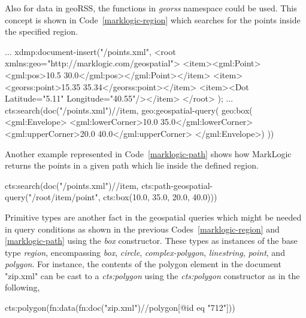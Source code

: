 \documentclass[a4paper,12pt]{article}
\begin{document}
Also for data in geoRSS, the functions in \textit{georss} namespace could be used. 
This concept is shown in Code~\ref{marklogic-region} which searches for the points inside the specified region. 
\vspace{10px}
\begin{fakeXML}[escapechar=\%,label=marklogic-region,caption=A query example in MarkLogic]
...
xdmp:document-insert("/points.xml",
<root xmlns:geo="http://marklogic.com/geospatial">
  <item><gml:Point><gml:pos>10.5 30.0</gml:pos></gml:Point></item>
  <item><georss:point>15.35 35.34</georss:point></item>
  <item><Dot Latitude="5.11" Longitude="40.55"/></item>
</root> );
 ...
cts:search(doc("/points.xml")//item, 
 geo:geospatial-query(
   geo:box(
     <gml:Envelope>
       <gml:lowerCorner>10.0 35.0</gml:lowerCorner>
       <gml:upperCorner>20.0 40.0</gml:upperCorner>
     </gml:Envelope>)
 ))
 
 \end{fakeXML}
\vspace{10px}
Another example represented in Code~\ref{marklogic-path} shows how MarkLogic returns the 
points in a given path which lie inside the defined region.
\vspace{10px}
\begin{fakeXML}[escapechar=\%,label=marklogic-path,caption=Another query example in MarkLogic]
cts:search(doc("/points.xml")//item,
  cts:path-geospatial-query("/root/item/point", 
  			cts:box(10.0, 35.0, 20.0, 40.0)))
\end{fakeXML}
\vspace{10px}

Primitive types are another fact in the geospatial queries which might be needed in query conditions 
as shown in the previous Codes~\ref{marklogic-region} and \ref{marklogic-path} using the \textit{box} constructor. These types as instances of the base type \textit{region}, encompassing \textit{box}, \textit{circle}, \textit{complex-polygon}, \textit{linestring}, \textit{point}, and \textit{polygon}. For instance, the contents of the polygon element in the document "zip.xml" can be cast to a \textit{cts:polygon} using the \textit{cts:polygon} constructor as in the following,
\vspace{10px}
\begin{fakeJSON}
cts:polygon(fn:data(fn:doc("zip.xml")//polygon[@id eq "712"]))
\end{fakeJSON}
\vspace{10px}
\end{document}
